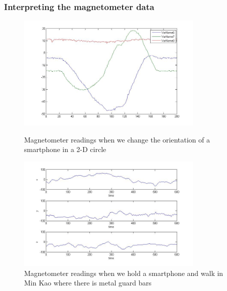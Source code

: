 \documentclass[journal]{IEEEtran}
\begin{document}
\subsubsection{Interpreting the magnetometer data}
\begin{figure}
	\centering
	\includegraphics[width=3.5in]{figures/mag-flat}
	\caption{Magnetometer readings when we change the orientation of a smartphone in a 2-D circle}
	\includegraphics[width=3.5in]{figures/indoor-flat-mag}
	\caption{Magnetometer readings when we hold a smartphone and walk in Min Kao where there is metal guard bars}
\end{figure}
\end{document}
